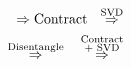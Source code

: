 \documentclass{article}
\begin{document}
	\begin{equation*}
		\begin{gathered}
			\vcenter{\hbox{}} \,\,
			\Rightarrow{\text{Contract}}\,\,
			\vcenter{\hbox{}}\,\, \overset{\text{SVD}}{\Rightarrow }\,\,
			\vcenter{\hbox{}} \\
			\overset{\text{Disentangle}}{\Rightarrow }\,\,
			\vcenter{\hbox{}} \,\, \overset{\begin{subarray}{c}
					\text{Contract}\\
					\text{+ SVD}
			\end{subarray}}{\Rightarrow }\,\,
			\vcenter{\hbox{}}
		\end{gathered}
	\end{equation*}
\end{document}
